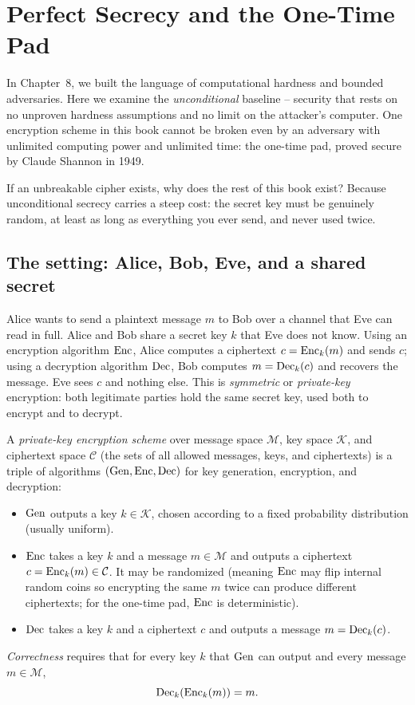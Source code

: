 \chapter{Perfect Secrecy and the One-Time Pad}

In Chapter~8, we built the language of computational hardness and bounded adversaries. Here we examine the \emph{unconditional} baseline -- security that rests on no unproven hardness assumptions and no limit on the attacker's computer. One encryption scheme in this book cannot be broken even by an adversary with unlimited computing power and unlimited time: the one-time pad, proved secure by Claude Shannon in 1949.

If an unbreakable cipher exists, why does the rest of this book exist? Because unconditional secrecy carries a steep cost: the secret key must be genuinely random, at least as long as everything you ever send, and never used twice.

\section{The setting: Alice, Bob, Eve, and a shared secret}
\label{ch09:setting}

Alice wants to send a plaintext message $m$ to Bob over a channel that Eve can read in full. Alice and Bob share a secret key $k$ that Eve does not know. Using an encryption algorithm $\operatorname{Enc}$, Alice computes a ciphertext $c = \operatorname{Enc}_k(m)$ and sends $c$; using a decryption algorithm $\operatorname{Dec}$, Bob computes $m = \operatorname{Dec}_k(c)$ and recovers the message. Eve sees $c$ and nothing else. This is \emph{symmetric} or \emph{private-key} encryption: both legitimate parties hold the same secret key, used both to encrypt and to decrypt.

\begin{definition}
\label{ch09:scheme-def}
A \emph{private-key encryption scheme} over message space $\mathcal{M}$, key space $\mathcal{K}$, and ciphertext space $\mathcal{C}$ (the sets of all allowed messages, keys, and ciphertexts) is a triple of algorithms $(\operatorname{Gen}, \operatorname{Enc}, \operatorname{Dec})$ for key generation, encryption, and decryption:
\begin{itemize}
  \item $\operatorname{Gen}$ outputs a key $k \in \mathcal{K}$, chosen according to a fixed probability distribution (usually uniform).
  \item $\operatorname{Enc}$ takes a key $k$ and a message $m \in \mathcal{M}$ and outputs a ciphertext $c = \operatorname{Enc}_k(m) \in \mathcal{C}$. It may be randomized (meaning $\operatorname{Enc}$ may flip internal random coins so encrypting the same $m$ twice can produce different ciphertexts; for the one-time pad, $\operatorname{Enc}$ is deterministic).
  \item $\operatorname{Dec}$ takes a key $k$ and a ciphertext $c$ and outputs a message $m = \operatorname{Dec}_k(c)$.
\end{itemize}
\emph{Correctness} requires that for every key $k$ that $\operatorname{Gen}$ can output and every message $m \in \mathcal{M}$,
\[
  \operatorname{Dec}_k(\operatorname{Enc}_k(m)) = m.
\]
\end{definition}

